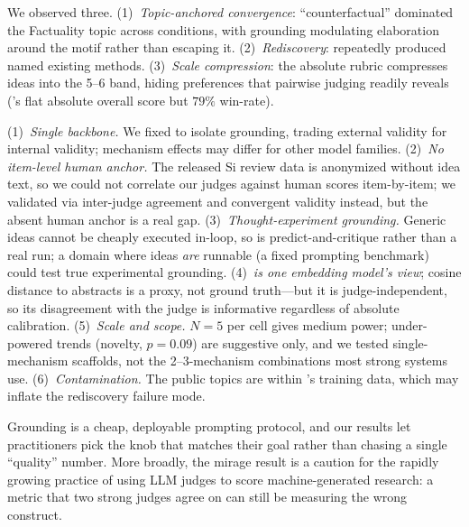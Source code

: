  We observed three. (1)~\emph{Topic-anchored convergence}: ``counterfactual'' dominated the Factuality topic across conditions, with grounding modulating elaboration around the motif rather than escaping it. (2)~\emph{Rediscovery}: \smallexp repeatedly produced named existing methods. (3)~\emph{Scale compression}: the absolute rubric compresses ideas into the 5--6 band, hiding preferences that pairwise judging readily reveals (\eg \litcomp's flat absolute overall score but $79\%$ win-rate).

 (1)~\emph{Single backbone.} We fixed \gptfourone to isolate grounding, trading external validity for internal validity; mechanism effects may differ for other model families. (2)~\emph{No item-level human anchor.} The released Si review data is anonymized without idea text, so we could not correlate our judges against human scores item-by-item; we validated via inter-judge agreement and convergent validity instead, but the absent human anchor is a real gap. (3)~\emph{Thought-experiment grounding.} Generic ideas cannot be cheaply executed in-loop, so \smallexp is predict-and-critique rather than a real run; a domain where ideas \emph{are} runnable (\eg a fixed prompting benchmark) could test true experimental grounding. (4)~\emph{\lgn is one embedding model's view}; cosine distance to abstracts is a proxy, not ground truth---but it is judge-independent, so its disagreement with the judge is informative regardless of absolute calibration. (5)~\emph{Scale and scope.} $N = 5$ per cell gives medium power; under-powered trends (\eg \outcome novelty, $p = 0.09$) are suggestive only, and we tested single-mechanism scaffolds, not the 2--3-mechanism combinations most strong systems use. (6)~\emph{Contamination.} The public topics are within \gptfourone's training data, which may inflate the rediscovery failure mode.

 Grounding is a cheap, deployable prompting protocol, and our results let practitioners pick the knob that matches their goal rather than chasing a single ``quality'' number. More broadly, the mirage result is a caution for the rapidly growing practice of using LLM judges to score machine-generated research: a metric that two strong judges agree on can still be measuring the wrong construct.

